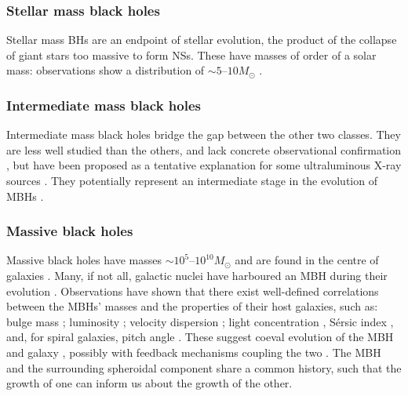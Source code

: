 \subsubsection{Stellar mass black holes}

Stellar mass BHs are an endpoint of stellar evolution, the product of the collapse of giant stars too massive to form NSs. These have masses of order of a solar mass: observations show a distribution of $\sim5$--$10M_\odot$ \citep{Ozel2010,Farr2010}. 

\subsubsection{Intermediate mass black holes}

Intermediate mass black holes bridge the gap between the other two classes. They are less well studied than the others, and lack concrete observational confirmation \citep{Miller2009a}, but have been proposed as a tentative explanation for some ultraluminous X-ray sources \citep{Feng2011}. They potentially represent an intermediate stage in the evolution of MBHs \citep{Graham2013}.

\subsubsection{Massive black holes}

Massive black holes have masses $\sim10^5$--$10^{10} M_\odot$ and are found in the centre of galaxies \citep{Lynden-Bell1969,Ferrarese2005}. Many, if not all, galactic nuclei have harboured an MBH during their evolution \citep{Lynden-Bell1971, Soltan1982, Rees1984}. Observations have shown that there exist well-defined correlations between the MBHs' masses and the properties of their host galaxies, such as: bulge mass \citep{Kormendy1995,Haring2004,Graham2012a}; luminosity \citep{Magorrian1998,Marconi2003,Graham2013}; velocity dispersion \citep{Ferrarese2000,Gebhardt2000,Tremaine2002,Graham2011}; light concentration \citep{Graham2001}, S{\'e}rsic index \citep{Graham2007a,Savorgnan2013}, and, for spiral galaxies, pitch angle \citep{Seigar2008,Berrier2013}. These suggest coeval evolution of the MBH and galaxy \citep{Peng2007, Jahnke2011}, possibly with feedback mechanisms coupling the two \citep{Haiman2004, Volonteri2009}. The MBH and the surrounding spheroidal component share a common history, such that the growth of one can inform us about the growth of the other.

